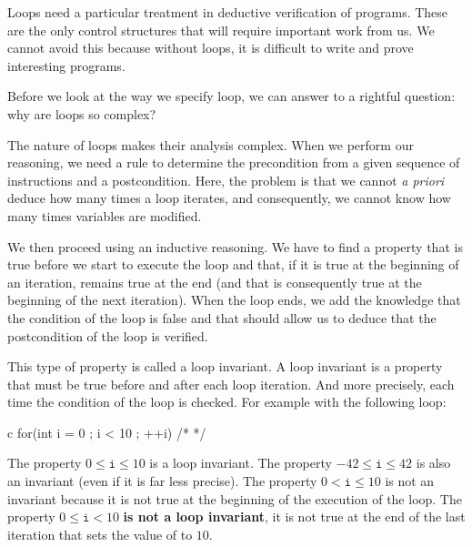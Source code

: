 Loops need a particular treatment in deductive verification of
programs. These are the only control structures that will require
important work from us. We cannot avoid this because without loops, it
is difficult to write and prove interesting programs.



Before we look at the way we specify loop, we can answer to a rightful
question: why are loops so complex?



\label{l3:statements-loops-invariant}


The nature of loops makes their analysis complex. When we perform our
reasoning, we need a rule to determine the precondition from a given sequence
of instructions and a postcondition. Here, the problem is that we cannot
\emph{a priori} deduce how many times a loop iterates, and consequently, we
cannot know how many times variables are modified.



We then proceed using an inductive reasoning. We have to find a
property that is true before we start to execute the loop and that, if
it is true at the beginning of an iteration, remains true at the end
(and that is consequently true at the beginning of the next iteration).
When the loop ends, we add the knowledge that the condition of the loop is
false and that should allow us to deduce that the postcondition of the loop
is verified.



This type of property is called a loop invariant. A loop invariant is a
property that must be true before and after each loop iteration. And more
precisely, each time the condition of the loop is checked. For example with
the following loop:



\begin{CodeBlock}{c}
for(int i = 0 ; i < 10 ; ++i){ /* */ }
\end{CodeBlock}



The property $0 \leq \texttt{i} \leq 10$ is a loop invariant. The property
$-42 \leq \texttt{i} \leq 42$ is also an invariant (even if it is far less
precise). The property $0 < \texttt{i} \leq 10$ is not an invariant because it is
not true at the beginning of the execution of the loop. The property
$0 \leq \texttt{i} < 10$ \textbf{is not a loop invariant}, it is not true at the
end of the last iteration that sets the value of  to $10$.

